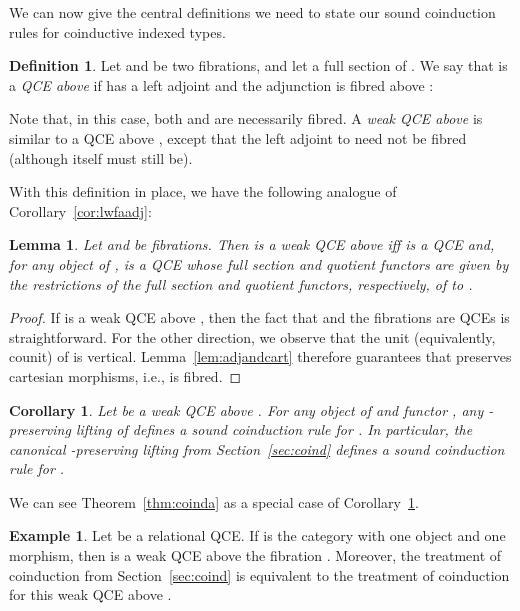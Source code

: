 \documentclass{LMCS}
\theoremstyle{plain}
\newtheorem{corollary}[theorem]{Corollary}
\newtheorem{lemma}[theorem]{Lemma}
\theoremstyle{remark}
\theoremstyle{definition}
\newtheorem{definition}[theorem]{Definition}
\newtheorem{example}[theorem]{Example}
\begin{document}
We can now give the central definitions we need to state our sound
coinduction rules for coinductive indexed types.

\begin{definition}\label{def:qcea}
  Let  and  be two fibrations, and let
   a full section of . We say that  is a \emph{QCE
    above } if  has a left adjoint  and the
  adjunction  is fibred above :
   

\vspace*{0.1in}

\noindent
Note that, in this case, both  and  are necessarily fibred.  A
{\em weak QCE above } is similar to a QCE above , except that
the left adjoint to  need not be fibred (although  itself must
still be).
\end{definition}
\noindent

With this definition in place, we have the following analogue of
Corollary~\ref{cor:lwfaadj}: 

\begin{lemma}
Let  and  be fibrations. Then  is a weak
QCE above  iff  is a QCE and, for any object  of ,
 is a QCE whose full section and quotient functors
are given by the restrictions of the full section and quotient
functors, respectively, of  to .
\end{lemma}

\begin{proof}
If  is a weak QCE above , then the fact that  and the
fibrations  are QCEs is straightforward. For the other direction,
we observe that the unit (equivalently, counit) of  is
vertical. Lemma~\ref{lem:adjandcart} therefore guarantees that 
preserves cartesian morphisms, i.e., is fibred.
\end{proof}

\begin{corollary}\label{cor:icoind}
  Let  be a weak QCE above . For any object 
  of  and functor , any -preserving lifting
   of  defines a sound coinduction rule for
  . In particular, the canonical -preserving lifting from
  Section~\ref{sec:coind} defines a sound coinduction rule for .
\end{corollary}

We can see Theorem~\ref{thm:coinda} as a special case of 
Corollary~\ref{cor:icoind}.

\begin{example}\label{ex:sec3}
  Let  be a relational QCE. If  is the category with
  one object and one morphism, then  is a weak QCE above the
  fibration . Moreover, the treatment of coinduction from
  Section~\ref{sec:coind} is equivalent to the treatment of
  coinduction for this weak QCE above .
\end{example}
\end{document}
